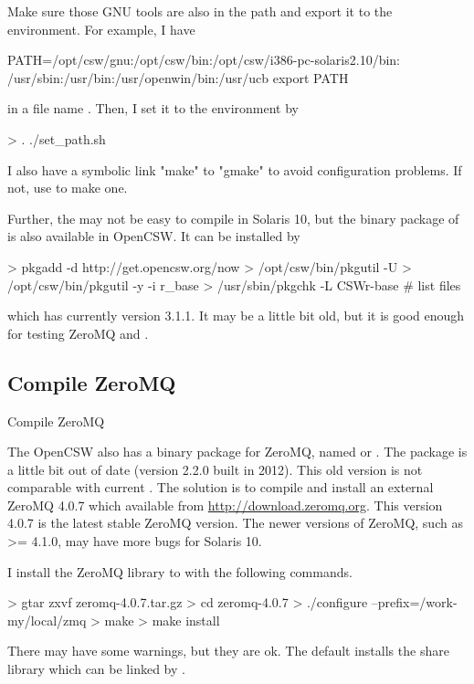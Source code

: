 Make sure those GNU tools are also in the path and export it to
the environment. For example, I have
\begin{Code}
PATH=/opt/csw/gnu:/opt/csw/bin:/opt/csw/i386-pc-solaris2.10/bin:
/usr/sbin:/usr/bin:/usr/openwin/bin:/usr/ucb
export PATH
\end{Code}
in a file name . Then, I set it to the environment by
\begin{Code}
> . ./set_path.sh
\end{Code}
I also have a symbolic link "make" to "gmake" to avoid configuration problems.
If not, use  to make one.

Further, the  may not be easy to compile in Solaris 10, but the
binary package of  is also available in OpenCSW. It can be
installed by
\begin{Code}
> pkgadd -d http://get.opencsw.org/now
> /opt/csw/bin/pkgutil -U
> /opt/csw/bin/pkgutil -y -i r_base 
> /usr/sbin/pkgchk -L CSWr-base # list files
\end{Code}
which has currently  version 3.1.1. It may be a little bit old,
but it is good enough for testing ZeroMQ and .


\subsection{Compile ZeroMQ}{Compile ZeroMQ}
\label{sec:compile_zeromq}
The OpenCSW also has a binary package for ZeroMQ, named  or
.
The package is a little bit out of date (version 2.2.0 built in 2012).
This old version is not comparable with current .
The solution is to compile and install an external ZeroMQ 4.0.7
which available from \url{http://download.zeromq.org}.
This version 4.0.7 is the latest stable ZeroMQ version.
The newer versions of ZeroMQ, such as >= 4.1.0, may have more bugs
for Solaris 10.

I install the ZeroMQ library to  with
the following commands.
\begin{Code}
> gtar zxvf zeromq-4.0.7.tar.gz
> cd zeromq-4.0.7
> ./configure --prefix=/work-my/local/zmq 
> make
> make install
\end{Code}
There may have some warnings, but they are ok. The default installs
the share library which can be linked by .


